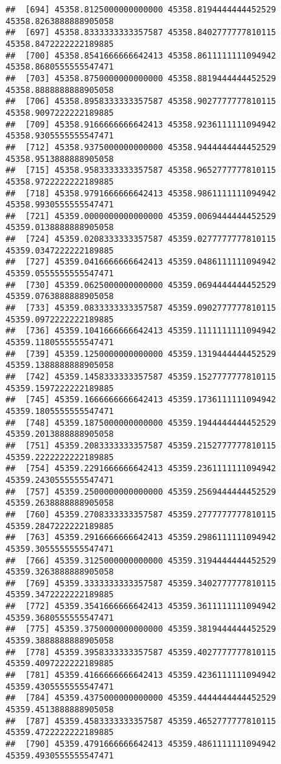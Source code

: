 \documentclass[
]{article}
\begin{document}
\begin{verbatim}
##  [694] 45358.8125000000000000 45358.8194444444452529 45358.8263888888905058
##  [697] 45358.8333333333357587 45358.8402777777810115 45358.8472222222189885
##  [700] 45358.8541666666642413 45358.8611111111094942 45358.8680555555547471
##  [703] 45358.8750000000000000 45358.8819444444452529 45358.8888888888905058
##  [706] 45358.8958333333357587 45358.9027777777810115 45358.9097222222189885
##  [709] 45358.9166666666642413 45358.9236111111094942 45358.9305555555547471
##  [712] 45358.9375000000000000 45358.9444444444452529 45358.9513888888905058
##  [715] 45358.9583333333357587 45358.9652777777810115 45358.9722222222189885
##  [718] 45358.9791666666642413 45358.9861111111094942 45358.9930555555547471
##  [721] 45359.0000000000000000 45359.0069444444452529 45359.0138888888905058
##  [724] 45359.0208333333357587 45359.0277777777810115 45359.0347222222189885
##  [727] 45359.0416666666642413 45359.0486111111094942 45359.0555555555547471
##  [730] 45359.0625000000000000 45359.0694444444452529 45359.0763888888905058
##  [733] 45359.0833333333357587 45359.0902777777810115 45359.0972222222189885
##  [736] 45359.1041666666642413 45359.1111111111094942 45359.1180555555547471
##  [739] 45359.1250000000000000 45359.1319444444452529 45359.1388888888905058
##  [742] 45359.1458333333357587 45359.1527777777810115 45359.1597222222189885
##  [745] 45359.1666666666642413 45359.1736111111094942 45359.1805555555547471
##  [748] 45359.1875000000000000 45359.1944444444452529 45359.2013888888905058
##  [751] 45359.2083333333357587 45359.2152777777810115 45359.2222222222189885
##  [754] 45359.2291666666642413 45359.2361111111094942 45359.2430555555547471
##  [757] 45359.2500000000000000 45359.2569444444452529 45359.2638888888905058
##  [760] 45359.2708333333357587 45359.2777777777810115 45359.2847222222189885
##  [763] 45359.2916666666642413 45359.2986111111094942 45359.3055555555547471
##  [766] 45359.3125000000000000 45359.3194444444452529 45359.3263888888905058
##  [769] 45359.3333333333357587 45359.3402777777810115 45359.3472222222189885
##  [772] 45359.3541666666642413 45359.3611111111094942 45359.3680555555547471
##  [775] 45359.3750000000000000 45359.3819444444452529 45359.3888888888905058
##  [778] 45359.3958333333357587 45359.4027777777810115 45359.4097222222189885
##  [781] 45359.4166666666642413 45359.4236111111094942 45359.4305555555547471
##  [784] 45359.4375000000000000 45359.4444444444452529 45359.4513888888905058
##  [787] 45359.4583333333357587 45359.4652777777810115 45359.4722222222189885
##  [790] 45359.4791666666642413 45359.4861111111094942 45359.4930555555547471

\end{verbatim}
\end{document}
